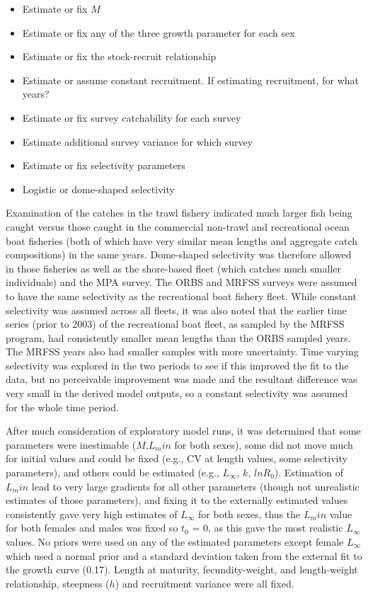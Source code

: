 \documentclass[11pt,
  english,
  letterpaper,
]{article}
\providecommand{\tightlist}{%
  \setlength{\itemsep}{0pt}\setlength{\parskip}{0pt}}
\providecommand{\tightlist}{%
  \setlength{\itemsep}{0pt}\setlength{\parskip}{0pt}}
\begin{document}
\begin{itemize}
\tightlist
\item
  Estimate or fix \(M\)
\item
  Estimate or fix any of the three growth parameter for each sex
\item
  Estimate or fix the stock-recruit relationship
\item
  Estimate or assume constant recruitment. If estimating recruitment, for what years?
\item
  Estimate or fix survey catchability for each survey
\item
  Estimate additional survey variance for which survey
\item
  Estimate or fix selectivity parameters
\item
  Logistic or dome-shaped selectivity
\end{itemize}

Examination of the catches in the trawl fishery indicated much larger fish being caught versus those caught in the commercial non-trawl and recreational ocean boat fisheries (both of which have very similar mean lengths and aggregate catch compositions) in the same years. Dome-shaped selectivity was therefore allowed in those fisheries as well as the shore-based fleet (which catches much smaller individuals) and the MPA survey. The ORBS and MRFSS surveys were assumed to have the same selectivity as the recreational boat fishery fleet. While constant selectivity was assumed across all fleets, it was also noted that the earlier time series (prior to 2003) of the recreational boat fleet, as sampled by the MRFSS program, had consistently smaller mean lengths than the ORBS sampled years. The MRFSS years also had smaller samples with more uncertainty. Time varying selectivity was explored in the two periods to see if this improved the fit to the data, but no perceivable improvement was made and the resultant difference was very small in the derived model outputs, so a constant selectivity was assumed for the whole time period.

After much consideration of exploratory model runs, it was determined that some parameters were inestimable (\(M\),\(L_min\) for both sexes), some did not move much for initial values and could be fixed (e.g., CV at length values, some selectivity parameters), and others could be estimated (e.g., \(L_{\infty}\), \(k\), \(lnR_0\)). Estimation of \(L_min\) lead to very large gradients for all other parameters (though not unrealistic estimates of those parameters), and fixing it to the externally estimated values consistently gave very high estimates of \(L_{\infty}\) for both sexes, thus the \(L_min\) value for both females and males was fixed so \(t_0\) = 0, as this gave the most realistic \(L_{\infty}\) values. No priors were used on any of the estimated parameters except female \(L_{\infty}\) which used a normal prior and a standard deviation taken from the external fit to the growth curve (0.17). Length at maturity, fecundity-weight, and length-weight relationship, steepness (\(h\)) and recruitment variance were all fixed.
\end{document}

